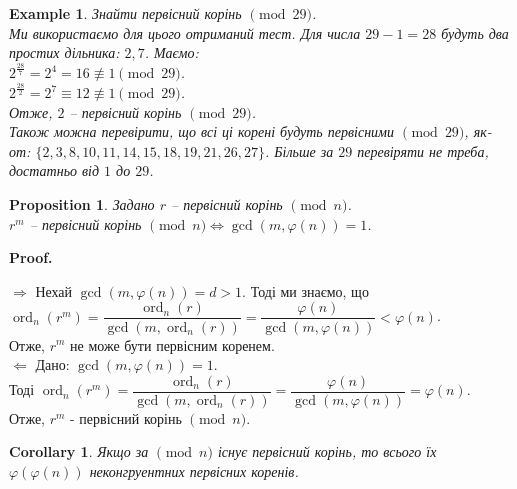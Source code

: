 \documentclass[a4paper, 14pt]{extarticle}
\makeatletter
\theoremstyle{theoremdd}
\theoremstyle{theoremdd}
\theoremstyle{theoremdd}
\theoremstyle{theoremdd}
\newtheorem{example}[theorem]{Example}
\theoremstyle{theoremdd}
\newtheorem{proposition}[theorem]{Proposition}
\theoremstyle{theoremdd}
\theoremstyle{theoremdd}
\theoremstyle{theoremdd}
\newtheorem{corollary}[theorem]{Corollary}
\def\qed{$\blacksquare$}
\def\rightproof{$\boxed{\Rightarrow}$ }
\def\leftproof{$\boxed{\Leftarrow}$ }
\renewenvironment{proof}[1][Proof.\\]{\par
\pushQED{\hfill \qed}%
\normalfont \topsep6\p@\@plus6\p@\relax
\trivlist
\item\relax
{\bfseries
#1\@addpunct{.}}\hspace\labelsep\ignorespaces
}{%
\popQED\endtrivlist\@endpefalse
}
\DeclareMathOperator{\ord}{ord}
\makeatother
\begin{document}
\begin{example}
Знайти первісний корінь $\!\! \pmod {29}$.\\
Ми використаємо для цього отриманий тест. Для числа $29-1=28$ будуть два простих дільника: $2,7$. Маємо:\\
$2^{\frac{28}{7}} = 2^4 = 16 \not\equiv 1 \pmod {29}$.\\
$2^{\frac{28}{2}} = 2^7 \equiv 12 \not\equiv 1 \pmod {29}$.\\
Отже, $2$ -- первісний корінь $\pmod {29}$.\\
Також можна перевірити, що всі ці корені будуть первісними $\pmod {29}$, як-от: $\{2,3,8,10,11,14,15,18,19,21,26,27\}$. Більше за $29$ перевіряти не треба, достатньо від $1$ до $29$.
\end{example}

\begin{proposition}
Задано $r$ -- первісний корінь $\!\! \pmod n$.\\
$r^m$ -- первісний корінь $\pmod n \iff \gcd(m,\varphi(n)) = 1$.
\end{proposition}

\begin{proof}
\rightproof Нехай $\gcd(m,\varphi(n)) = d > 1$. Тоді ми знаємо, що\\
$\ord_n (r^m) = \dfrac{\ord_n (r)}{\gcd(m,\ord_n (r))} = \dfrac{\varphi(n)}{\gcd(m,\varphi(n))} < \varphi(n)$.\\
Отже, $r^m$ не може бути первісним коренем.
\bigskip \\
\leftproof Дано: $\gcd(m,\varphi(n)) = 1$.\\
Тоді $\ord_{n} (r^m) = \dfrac{\ord_n (r)}{\gcd(m,\ord_n (r))} = \dfrac{\varphi(n)}{\gcd(m,\varphi(n))} = \varphi(n)$.\\
Отже, $r^m$ - первісний корінь $\pmod n$.
\end{proof}

\begin{corollary}
Якщо за $\pmod n$ існує первісний корінь, то всього їх $\varphi(\varphi(n))$ неконгруентних первісних коренів.
\end{corollary}

\iffalse
\begin{proposition}
Задано $r$ - первісний корінь $\pmod n$.\\
$r^a \equiv r^b \pmod n \iff a \equiv b \pmod {\varphi(n)}$.
\end{proposition}

\begin{proof}
\rightproof Дано: $r^a \equiv r^b \pmod n$.\\
Тоді $r^{a-b} \equiv 1 \pmod n$, тобто $\ord_n(r) = \varphi(n) \mid a-b$, тобто $a \equiv b \pmod {\varphi(n)}$.
\bigskip \\
\leftproof Дано: $a \equiv b \pmod {\varphi(n)}$.\\
Тоді $a = b + k\varphi(n)$ для деякого $k \in \mathbb{Z}$, тож\\
$r^a = r^{b+k\varphi(n)} = r^b (r^k)^{\varphi(n)} \equiv r^b \pmod n$.
\end{proof}
\fi
\end{document}
